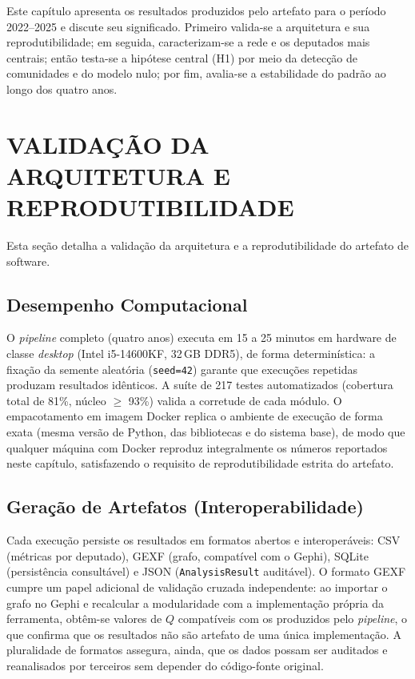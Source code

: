 \documentclass[
      12pt,
      a4paper,
      openright,
      oneside,
      chapter=TITLE,
      section=TITLE,
      english,
      french,
      spanish,
      brazilian
    ]{abntex2}
\begin{document}
    Este capítulo apresenta os resultados produzidos pelo artefato para o período 2022--2025 e discute seu significado. Primeiro valida-se a arquitetura e sua reprodutibilidade; em seguida, caracterizam-se a rede e os deputados mais centrais; então testa-se a hipótese central (H1) por meio da detecção de comunidades e do modelo nulo; por fim, avalia-se a estabilidade do padrão ao longo dos quatro anos.
    
    \section{VALIDAÇÃO DA ARQUITETURA E REPRODUTIBILIDADE}

    Esta seção detalha a validação da arquitetura e a reprodutibilidade do artefato de software.
    
    \subsection{Desempenho Computacional}
    
    O \textit{pipeline} completo (quatro anos) executa em 15 a 25 minutos em hardware de classe \textit{desktop} (Intel i5-14600KF, 32\,GB DDR5), de forma determinística: a fixação da semente aleatória (\texttt{seed=42}) garante que execuções repetidas produzam resultados idênticos. A suíte de 217 testes automatizados (cobertura total de 81\%, núcleo $\geq$ 93\%) valida a corretude de cada módulo. O empacotamento em imagem Docker replica o ambiente de execução de forma exata (mesma versão de Python, das bibliotecas e do sistema base), de modo que qualquer máquina com Docker reproduz integralmente os números reportados neste capítulo, satisfazendo o requisito de reprodutibilidade estrita do artefato.
    
    \subsection{Geração de Artefatos (Interoperabilidade)}
    
    Cada execução persiste os resultados em formatos abertos e interoperáveis: CSV (métricas por deputado), GEXF (grafo, compatível com o Gephi), SQLite (persistência consultável) e JSON (\texttt{AnalysisResult} auditável). O formato GEXF cumpre um papel adicional de validação cruzada independente: ao importar o grafo no Gephi e recalcular a modularidade com a implementação própria da ferramenta, obtêm-se valores de $Q$ compatíveis com os produzidos pelo \textit{pipeline}, o que confirma que os resultados não são artefato de uma única implementação. A pluralidade de formatos assegura, ainda, que os dados possam ser auditados e reanalisados por terceiros sem depender do código-fonte original.
\end{document}
